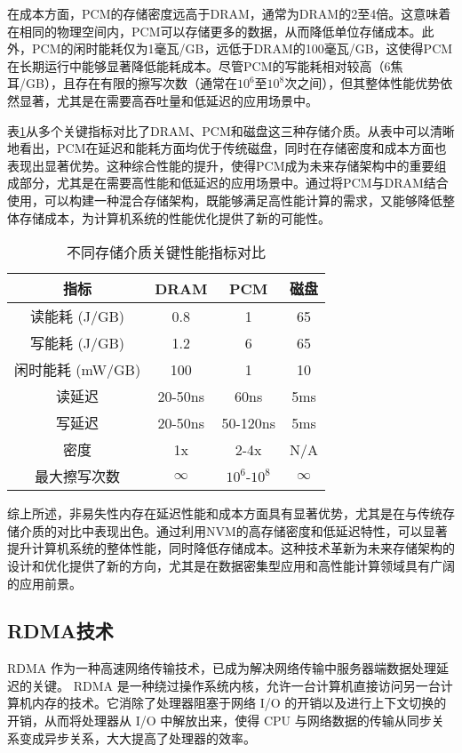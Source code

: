 在成本方面，PCM的存储密度远高于DRAM，通常为DRAM的2至4倍。这意味着在相同的物理空间内，PCM可以存储更多的数据，从而降低单位存储成本。此外，PCM的闲时能耗仅为1毫瓦/GB，远低于DRAM的100毫瓦/GB，这使得PCM在长期运行中能够显著降低能耗成本。尽管PCM的写能耗相对较高（6焦耳/GB），且存在有限的擦写次数（通常在$10^6$至$10^8$次之间），但其整体性能优势依然显著，尤其是在需要高吞吐量和低延迟的应用场景中。

表\ref{tab:storage_comparison}从多个关键指标对比了DRAM、PCM和磁盘这三种存储介质。从表中可以清晰地看出，PCM在延迟和能耗方面均优于传统磁盘，同时在存储密度和成本方面也表现出显著优势。这种综合性能的提升，使得PCM成为未来存储架构中的重要组成部分，尤其是在需要高性能和低延迟的应用场景中。通过将PCM与DRAM结合使用，可以构建一种混合存储架构，既能够满足高性能计算的需求，又能够降低整体存储成本，为计算机系统的性能优化提供了新的可能性。

\begin{table}[h]
    \centering
    \caption{不同存储介质关键性能指标对比}
    \label{tab:storage_comparison}
    \begin{tabular}{cccc}
    \toprule
    指标       & DRAM     & PCM      & 磁盘      \\
    \midrule
    读能耗 (J/GB) & 0.8      & 1        & 65       \\
    写能耗 (J/GB) & 1.2      & 6        & 65       \\
    闲时能耗 (mW/GB) & 100      & 1        & 10       \\
    读延迟     & 20-50ns   & 60ns      & 5ms       \\
    写延迟     & 20-50ns   & 50-120ns  & 5ms       \\
    密度       & 1x       & 2-4x     & N/A      \\
    最大擦写次数   & $\infty$ & $10^6$-$10^8$ & $\infty$ \\
    \bottomrule
    \end{tabular}
    \end{table}
综上所述，非易失性内存在延迟性能和成本方面具有显著优势，尤其是在与传统存储介质的对比中表现出色。通过利用NVM的高存储密度和低延迟特性，可以显著提升计算机系统的整体性能，同时降低存储成本。这种技术革新为未来存储架构的设计和优化提供了新的方向，尤其是在数据密集型应用和高性能计算领域具有广阔的应用前景。

\subsection{RDMA技术}

 RDMA 作为一种高速网络传输技术，已成为解决网络传输中服务器端数据处理延迟的关键。 RDMA 是一种绕过操作系统内核，允许一台计算机直接访问另一台计算机内存的技术。它消除了处理器阻塞于网络 I/O 的开销以及进行上下文切换的开销，从而将处理器从 I/O 中解放出来，使得 CPU 与网络数据的传输从同步关系变成异步关系，大大提高了处理器的效率。

